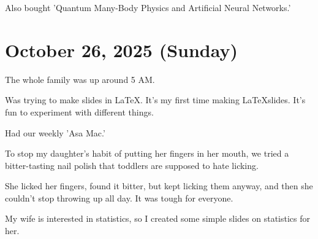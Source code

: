 \documentclass{article}
\begin{document}
Also bought 'Quantum Many-Body Physics and Artificial Neural Networks.'

\section{October 26, 2025 (Sunday)}

The whole family was up around 5 AM.

Was trying to make slides in \LaTeX.
It's my first time making \LaTeX slides.
It's fun to experiment with different things.

Had our weekly 'Asa Mac.'

To stop my daughter's habit of putting her fingers in her mouth, we tried a bitter-tasting nail polish that toddlers are supposed to hate licking.

She licked her fingers, found it bitter, but kept licking them anyway, and then she couldn't stop throwing up all day. It was tough for everyone.

My wife is interested in statistics, so I created some simple slides on statistics for her.
\end{document}
